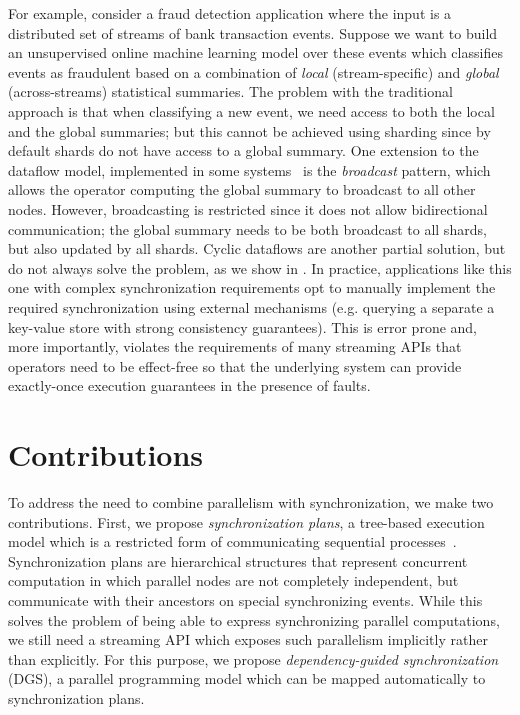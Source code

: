 For example, consider a fraud detection application where the input is a distributed set of streams of bank transaction events. Suppose we want to build an unsupervised online machine learning model over these events which classifies events as fraudulent based on a combination of \emph{local} (stream-specific) and \emph{global} (across-streams) statistical summaries.
The problem with the traditional approach is that when classifying a new event, we need access to both the local and the global summaries; but this cannot be achieved using sharding since by default shards do not have access to a global summary.
One extension to the dataflow model, implemented in some systems~\cite{Flink,Timely} is the \emph{broadcast} pattern, which allows the operator computing the global summary to broadcast to all other nodes.
However, broadcasting is restricted since it does not allow bidirectional communication;
the global summary needs to be both broadcast to all shards, but also updated by all shards.
Cyclic dataflows are another partial solution, but do not always solve the problem, as we show in .
In practice, applications like this one with complex synchronization requirements opt to  manually
implement the required synchronization using
external mechanisms (e.g. querying a separate a key-value store with strong consistency guarantees). This is error prone and, more importantly, violates the requirements of many streaming APIs that operators need to be effect-free so that the underlying system can provide exactly-once execution guarantees in the presence of faults.

\section{Contributions}

To address the need to combine parallelism with synchronization, we make two contributions. First, we propose \emph{synchronization plans}, a tree-based execution model which is a restricted form of communicating sequential processes~\cite{hoare1978communicating}.
Synchronization plans are hierarchical structures that represent concurrent computation in which parallel nodes are not completely independent, but communicate with their ancestors on special synchronizing events.
While this solves the problem of being able to express synchronizing parallel computations, we still need a streaming API which exposes such parallelism implicitly rather than explicitly.
For this purpose, we propose \emph{dependency-guided synchronization} (DGS), a parallel programming model which can be mapped automatically to synchronization plans.

